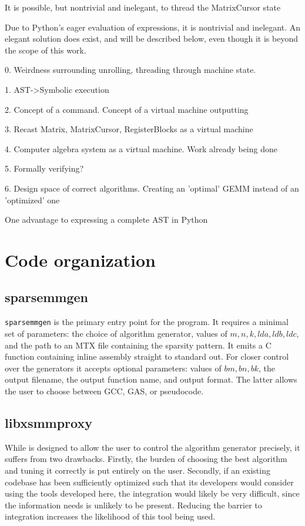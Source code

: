 It is possible, but nontrivial and inelegant, to thread the MatrixCursor state 

Due to Python's eager evaluation of expressions, it is nontrivial and inelegant. An elegant solution does exist, and will be described below, even though it is beyond the scope of this work.


0. Weirdness surrounding unrolling, threading through machine state. 

1. AST->Symbolic execution

2. Concept of a command. Concept of a virtual machine outputting 

3. Recast Matrix, MatrixCursor, RegisterBlocks as a virtual machine

4. Computer algebra system as a virtual machine. Work already being done 

5. Formally verifying?

6. Design space of correct algorithms. Creating an 'optimal' GEMM instead of an 'optimized' one






One advantage to expressing a complete AST in Python




\section{Code organization}

\subsection{sparsemmgen}

\texttt{sparsemmgen} is the primary entry point for the program. It requires a minimal set of parameters: the choice of algorithm generator, values of $m, n, k, lda, ldb, ldc,$ and the path to an MTX file containing the sparsity pattern. It emits a C function containing inline assembly straight to standard out. For closer control over the generators it accepts optional parameters: values of $bm, bn, bk$, the output filename, the output function name, and output format. The latter allows the user to choose between GCC, GAS, or pseudocode. 



\subsection{libxsmmproxy}

While  is designed to allow the user to control the algorithm generator precisely, it suffers from two drawbacks. Firstly, the burden of choosing the best algorithm and tuning it correctly is put entirely on the user. Secondly, if an existing codebase has been sufficiently optimized such that its developers would consider using the tools developed here, the integration would likely be very difficult, since the information  needs is unlikely to be present. Reducing the barrier to integration increases the likelihood of this tool being used.

